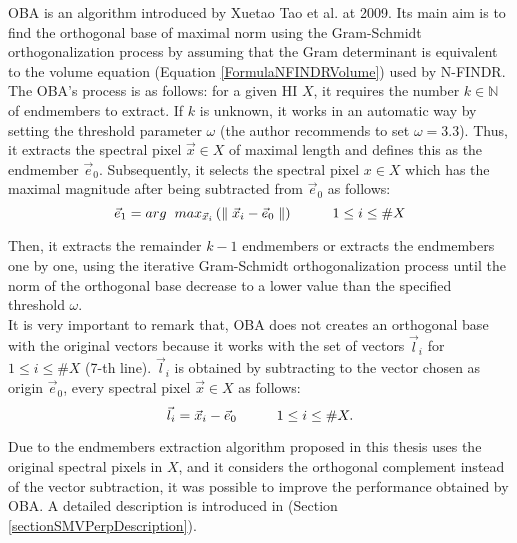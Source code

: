 \documentclass[11pt, oneside]{Thesis} %
\begin{document}
OBA is an algorithm introduced by Xuetao Tao et al. \cite{OBA} at 2009. Its 
main aim is to find the orthogonal base of maximal norm using the Gram-Schmidt 
orthogonalization process by assuming that the Gram determinant is equivalent 
to the volume equation (Equation \ref{FormulaNFINDRVolume}) used by N-FINDR. The 
OBA's process is as follows: for a given HI $X$, it requires the number 
$k \in \mathbb{N}$ of endmembers to extract. If $k$ is unknown, it works in an 
automatic way by setting the threshold parameter $\omega$ (the author recommends 
to set $\omega = 3.3$). Thus, it extracts the spectral pixel $\vec{x} \in X$ of 
maximal length and defines this as the endmember $\vec{e}_0$. Subsequently, it 
selects the spectral pixel $x \in X$ which has the maximal magnitude after being 
subtracted from $\vec{e}_0$ as follows:
\[
 \vec{e}_{1} = arg \hspace{2mm} max_{\vec{x}_i} \left( \parallel \vec{x}_i - 
 \vec{e}_0 \parallel \right) 
 \hspace{10mm} 1 \leq i \leq \#X
\]

Then, it extracts the remainder $k-1$ endmembers or extracts the endmembers one 
by one, using the iterative Gram-Schmidt orthogonalization process until the norm 
of the orthogonal base decrease to a lower value than the specified threshold 
$\omega$. \\

It is very important to remark that, OBA does not creates an orthogonal base with 
the original vectors because it works with the set of vectors $\vec{l}_i$ for 
$1 \leq i \leq \#X$ (7-th line). $\vec{l}_i$ is obtained by subtracting to the vector 
chosen as origin $\vec{e}_0$, every spectral pixel $\vec{x} \in X$ as follows: 
\[\vec{l}_i = \vec{x}_i - \vec{e}_0 \hspace{10mm} 1 \leq i \leq \#X. \]

Due to the endmembers extraction algorithm proposed in this thesis uses the original 
spectral pixels in $X$, and it considers the orthogonal complement instead of the 
vector subtraction, it was possible to improve the performance obtained by OBA. 
A detailed description is introduced in (Section \ref{sectionSMVPerpDescription}).
 
\end{document}
